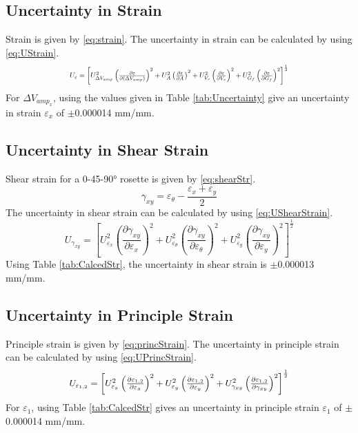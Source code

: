 \documentclass[10pt,journal,letterpaper]{IEEEtran}
\begin{document}
\subsection*{Uncertainty in Strain}

Strain is given by \eqref{eq:strain}.
The uncertainty in strain can be calculated by using \eqref{eq:UStrain}.
\begin{equation}
\label{eq:UStrain}
\resizebox{227pt}{!}{$U_{\varepsilon}=\left[U_{\Delta V_{amp}}^2 \left(\frac{\partial \varepsilon}{\partial (\Delta V_{amp})}\right)^2 + U_{A}^2 \left(\frac{\partial \varepsilon}{\partial A}\right)^2 + U_{V_s}^2 \left(\frac{\partial \varepsilon}{\partial V_s}\right)^2 + U_{G_f}^2 \left(\frac{\partial \varepsilon}{\partial G_f}\right)^2 \right]^{\frac{1}{2}}$}
\end{equation}
For $\Delta V_{amp_{x}}$, using the values given in Table \ref{tab:Uncertainty} give an uncertainty in strain $\varepsilon_x$ of $\pm$0.000014 mm/mm.

\subsection*{Uncertainty in Shear Strain}

Shear strain for a 0-45-\ang{90} rosette is given by \eqref{eq:shearStr}.
\begin{equation}
\label{eq:shearStr}
\gamma_{xy}=\varepsilon_\theta - \frac{\varepsilon_x+\varepsilon_y}{2}
\end{equation}
The uncertainty in shear strain can be calculated by using \eqref{eq:UShearStrain}.
\begin{equation}
\label{eq:UShearStrain}
U_{\gamma_{xy}}=\left[U_{\varepsilon_x}^2 \left(\frac{\partial \gamma_{xy}}{\partial \varepsilon_x}\right)^2 + U_{\varepsilon_\theta}^2 \left(\frac{\partial \gamma_{xy}}{\partial \varepsilon_\theta}\right)^2 + U_{\varepsilon_y}^2 \left(\frac{\partial \gamma_{xy}}{\partial \varepsilon_y}\right)^2 \right]^{\frac{1}{2}}
\end{equation}
Using Table \ref{tab:CalcedStr}, the uncertainty in shear strain is $\pm$0.000013 mm/mm.

\subsection*{Uncertainty in Principle Strain}

Principle strain is given by \eqref{eq:princStrain}.
The uncertainty in principle strain can be calculated by using \eqref{eq:UPrincStrain}.
\begin{equation}
\label{eq:UPrincStrain}
\resizebox{227pt}{!}{$U_{\varepsilon_{1,2}}=\left[U_{\varepsilon_x}^2 \left(\frac{\partial \varepsilon_{1,2}}{\partial \varepsilon_x}\right)^2 + U_{\varepsilon_y}^2 \left(\frac{\partial \varepsilon_{1,2}}{\partial \varepsilon_y}\right)^2 + U_{\gamma_{xy}}^2 \left(\frac{\partial \varepsilon_{1,2}}{\partial \gamma_{xy}}\right)^2 \right]^{\frac{1}{2}}$}
\end{equation}
For $\varepsilon_1$, using Table \ref{tab:CalcedStr} gives an uncertainty in principle strain $\varepsilon_1$ of $\pm$0.000014 mm/mm.
\end{document}

